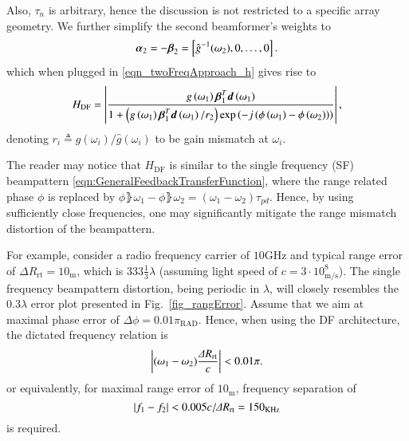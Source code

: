 Also, $\tau_n$ is arbitrary, hence the discussion is not restricted to a specific array geometry.
We further simplify the second beamformer's weights to 
\begin{equation}\label{eq_simpleBeta}
    \vAlphaI{2}=-\vBetaI{2}=\vBrace{\hat{g}^{-1}(\omega_2),0,\hdots,0}.
\end{equation}
which when plugged in \eqref{eqn_twoFreqApproach_h} gives rise to 
\begin{equation}
    H_{\text{DF}} = \lBrace{\frac{g\rBrace{\omega_{1}}\vBetaTI{1}\vdI{1}}{1+
    \rBrace{g\rBrace{\omega_{1}}\vBetaTI{1}\vdI{1}/r_{2}}\exp\rBrace{-j\rBrace{\phi\rBrace{\omega_{1}}-\phi\rBrace{\omega_{2}}}}
    }},
    \label{eq_H_DF_general}
\end{equation}
denoting $r_i\triangleq{}g(\omega_i)/\hat{g}(\omega_i)$ to be gain mismatch at $\omega_i$. 
\par The reader may notice that  $H_{\text{DF}}$ is similar to the single frequency (SF) beampattern \eqref{eqn:GeneralFeedbackTransferFunction}, where the range related phase $\phi$ is replaced by $\phi\rBrace{\omega_{1}}-\phi\rBrace{\omega_{2}}=(\omega_1-\omega_2)\tau_{pd}$. Hence, by using sufficiently close frequencies, one may significantly mitigate the range mismatch distortion of the beampattern.
\par For example, consider a radio frequency carrier of $10\text{GHz}$ and typical range error of $\Delta{}R_{\text{rt}}=10_{\text{m}}$, which is $333\frac{1}{3}\lambda$ (assuming light speed of $c=3\cdot 10^{8}_{\text{m/s}}$). The single frequency beampattern distortion, being periodic in $\lambda$, will closely resembles the $0.3\lambda$ error plot presented in Fig.~\ref{fig_rangError}. Assume that we aim at maximal phase error of $\Delta \phi=0.01\pi_{\text{RAD}}$. Hence, when using the DF architecture, the dictated frequency relation is
\begin{equation}\label{eq_DF_phErr}
\abs{(\omega_1-\omega_2)\frac{\Delta{}R_{\text{rt}}}{c}}<0.01\pi.
\end{equation}
or equivalently, for maximal range error of $10_\text{m}$, frequency separation of
\[
\left\vert f_1-f_2\right\vert<0.005 c/\Delta{}R_{\text{rt}}=150_{\text{KHz}}
\]
is required. 

